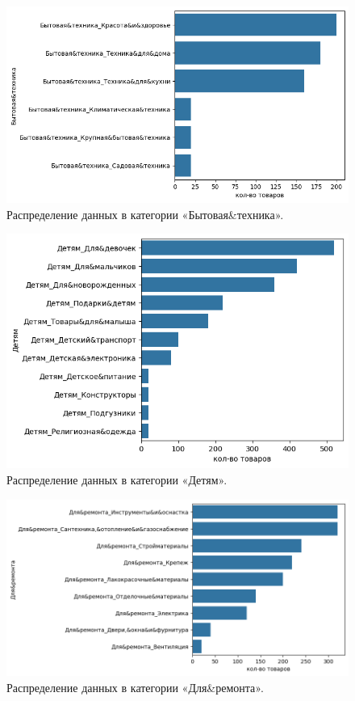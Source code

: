 \documentclass[a4paper,12pt]{extarticle}
\begin{document}
\begin{figure}[hbtp]
	\centering
	\includegraphics[scale=0.8]{приложения/amount_of_category_Бытовая&техника.png}
	\caption{Распределение данных в категории «Бытовая\&техника».}
	\label{fig:amount_of_category_Бытовая&техника}
\end{figure}

\begin{figure}[hbtp]
	\centering
	\includegraphics[scale=0.8]{приложения/amount_of_category_Детям.png}
	\caption{Распределение данных в категории «Детям».}
	\label{fig:amount_of_category_Детям}
\end{figure}

\begin{figure}[hbtp]
	\centering
	\includegraphics[scale=0.8]{приложения/amount_of_category_Для&ремонта.png}
	\caption{Распределение данных в категории «Для\&ремонта».}
	\label{fig:amount_of_category_Для&ремонта}
\end{figure}
\end{document}
